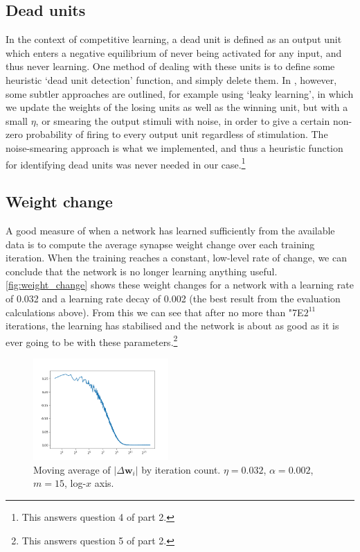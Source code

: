 \documentclass[a4paper, 11pt, twocolumn, final]{article} %
\begin{document}
\subsection{Dead units} \label{sec:deadunits} In the context of competitive
learning, a dead unit is defined as an output unit which enters a negative
equilibrium of never being activated for any input, and thus never learning. One
method of dealing with these units is to define some heuristic `dead unit
detection' function, and simply delete them.  In \cite[p221]{hertz91}, however,
some subtler approaches are outlined, for example using `leaky learning', in
which we update the weights of the losing units as well as the winning unit, but
with a small $\eta$, or smearing the output stimuli with noise, in order to give
a certain non-zero probability of firing to every output unit regardless of
stimulation.  The noise-smearing approach is what we implemented, and thus a
heuristic function for identifying dead units was never needed in our
case.\footnote{This answers question 4 of part 2.}

\subsection{Weight change} \label{sec:weight_change} A good measure of when a
network has learned sufficiently from the available data is to compute the
average synapse weight change over each training iteration.  When the training
reaches a constant, low-level rate of change, we can conclude that the network
is no longer learning anything useful.  \autoref{fig:weight_change} shows these
weight changes for a network with a learning rate of 0.032 and a learning rate
decay of 0.002 (the best result from the evaluation calculations above).  From
this we can see that after no more than \char"7E$2^{11}$ iterations, the
learning has stabilised and the network is about as good as it is ever going to
be with these parameters.\footnote{This answers question 5 of part 2.}

\begin{figure}
  \includegraphics[width=0.46\textwidth]{dw_average.png}
  \caption{Moving average of $|\Delta{}\bm{w}_i|$ by iteration count.
           $\eta = 0.032$, $\alpha = 0.002$, $m = 15$, log-$x$ axis.}
  \label{fig:weight_change}
\end{figure}
\end{document}
